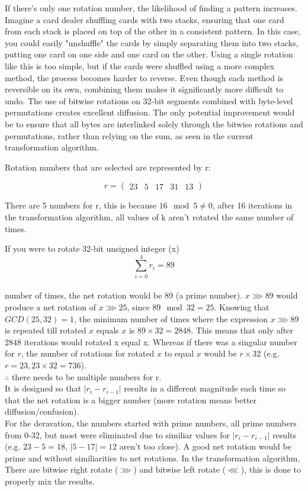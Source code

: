 \documentclass[fleqn, a4paper,12pt]{article}
\begin{document}
If there's only one rotation number, the likelihood of finding a pattern increases. Imagine a card dealer shuffling cards with two stacks, ensuring that one card from each stack is placed on top of the other in a consistent pattern. In this case, you could easily "unshuffle" the cards by simply separating them into two stacks, putting one card on one side and one card on the other. Using a single rotation like this is too simple, but if the cards were shuffled using a more complex method, the process becomes harder to reverse. Even though each method is reversible on its own, combining them makes it significantly more difficult to undo. The use of bitwise rotations on 32-bit segments combined with byte-level permutations creates excellent diffusion. The only potential improvement would be to ensure that all bytes are interlinked solely through the bitwise rotations and permutations, rather than relying on the sum, as seen in the current transformation algorithm.

Rotation numbers that are selected are represented by r:

\[
r = 
\begin{pmatrix}
		23 & 5 & 17 & 31 & 13
\end{pmatrix}
\]

There are 5 numbers for r, this is because $16 \mod 5 \neq 0$, after 16 iterations in the transformation algorithm, all values of k aren't rotated the same number of times.

If you were to rotate 32-bit unsigned integer (x)
\[
\sum_{i=0}^4 r_i = 89
\]
\\
number of times, the net rotation would be 89 (a prime number). $x \ggg 89$ would produce a net rotation of $x \ggg 25$, since $89 \mod 32=25$. Knowing that $GCD(25, 32) = 1$, the minimum number of times where the expression $x \ggg 89$ is repeated till rotated $x$ equals $x$ is $89 \times 32 = 2848$. This means that only after $2848$ iterations would rotated x equal x. Whereas if there was a singular number for $r$, the number of rotations for rotated $x$ to equal $x$ would be $r \times 32$ (e.g. $r=23, 23 \times 32 = 736$). \\

$\therefore$ there needs to be multiple numbers for r.
\\
It is designed so that $|r_i - r_{i-1}|$ results in a different magnitude each time so that the net rotation is a bigger number (more rotation means better diffusion/confusion).
\\
For the deravation, the numbers started with prime numbers, all prime numbers from 0-32, but most were eliminated due to similiar values for  $|r_i - r_{i-1}|$ results (e.g. $23-5=18$, $|5-17|=12$ aren't too close). A good net rotation would be prime and without similiarities to net rotations. In the transformation algorithm, There are bitwise right rotate ($\ggg$) and bitwise left rotate ($\lll$), this is done to properly mix the results.
\end{document}
